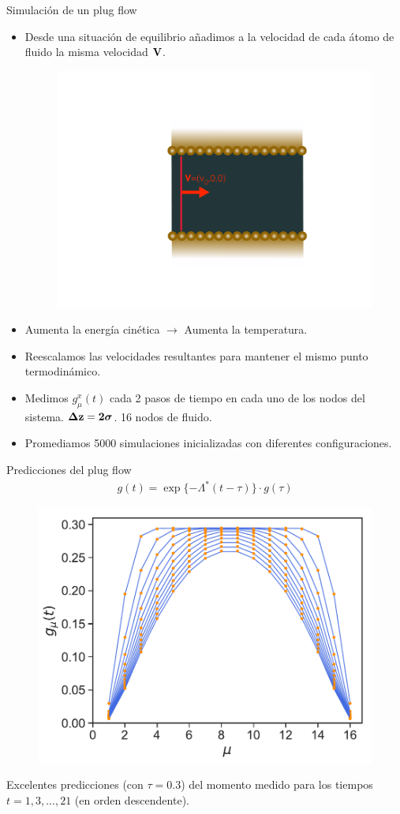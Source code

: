 \documentclass{beamer}
\newcommand{\esc}{\!\cdot\!}
\begin{document}
\begin{frame}{Simulación de un plug flow}
  \begin{itemize}
    \item<1-> Desde una situación de equilibrio añadimos a la velocidad de cada átomo de fluido la misma velocidad $\bf{V}$.
\begin{figure}[]
  \includegraphics[width=0.3\linewidth]{plug_flow}
\end{figure}
\item<2-> Aumenta la energía cinética $\rightarrow$ Aumenta la temperatura.
\item<3-> Reescalamos las velocidades resultantes para mantener el mismo punto termodinámico.
\item<4-> Medimos $g^x_{\mu}(t)$ cada 2 pasos de tiempo en cada uno de los nodos del sistema. $\boldsymbol{\Delta} {\bf z=2}\boldsymbol{\sigma}$. 16 nodos de fluido. 
\item<5-> Promediamos 5000 simulaciones inicializadas con diferentes configuraciones. 
  \end{itemize}
\end{frame}

\begin{frame}{Predicciones del plug flow}
  \begin{align}
    g(t)=\exp\{-\Lambda^* (t-\tau)\}\esc g(\tau)
    \nonumber
\end{align}
\begin{figure}[!h]
\includegraphics[width=0.55\linewidth]{gxtPredictions-17nodes-WALLS-defense1}
\end{figure}
  Excelentes {\color{orange} predicciones} (con $\tau=0.3$) del {\color{blue} momento medido} para los tiempos $t=1,3,...,21$ (en orden descendente).
\end{frame}
\end{document}

